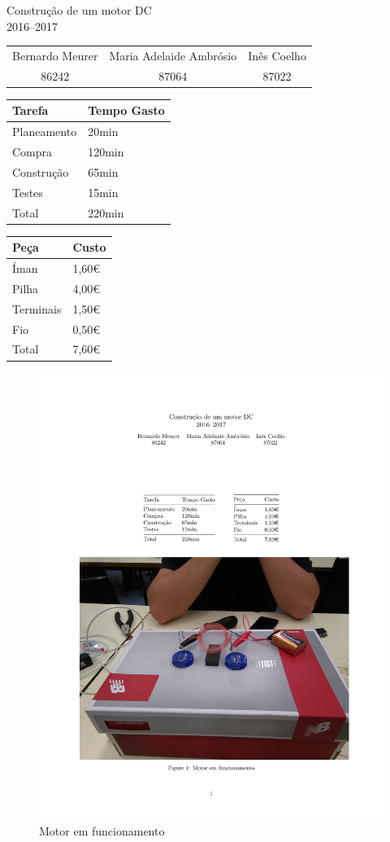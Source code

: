 \documentclass{article}
\begin{document}
\begin{center}
    \large{Construção de um motor DC}\\
    2016--2017
\end{center}
\centering
\begin{tabular}{ccc}
    Bernardo Meurer & Maria Adelaide Ambrósio & Inês Coelho\\
    86242 & 87064 & 87022
\end{tabular}
\vfill
\begin{table}[H]
\centering
\begin{tabular}{@{}ll@{}}
\toprule
Tarefa      & Tempo Gasto \\ \midrule
Planeamento & 20min       \\
Compra      & 120min      \\
Construção  & 65min       \\
Testes      & 15min       \\ \midrule
Total       & 220min
\end{tabular}
\hskip 30pt
\centering
\begin{tabular}{@{}ll@{}}
\toprule
Peça      & Custo \\ \midrule
Íman      & 1,60€ \\
Pilha     & 4,00€ \\
Terminais & 1,50€ \\
Fio       & 0,50€ \\ \midrule
Total     & 7,60€
\end{tabular}
\end{table}

\begin{figure}[H]
    \centering
    \includegraphics[scale=.25]{motor}
    \caption{Motor em funcionamento}
\end{figure}
\end{document}
